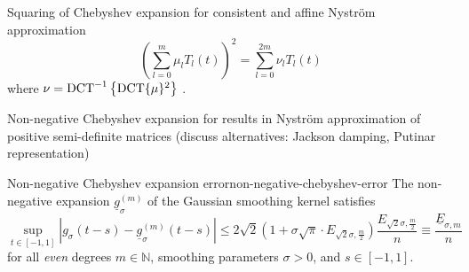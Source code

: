 \documentclass[12pt]{article}
\begin{document}
Squaring of Chebyshev expansion for consistent and affine Nystr\"om approximation
\begin{equation}
    \left( \sum_{l=0}^{m} \mu_l T_l(t) \right)^2 = \sum_{l=0}^{2m} \nu_l T_l(t)
    \label{equ:squared-chebyshev-expansion}
\end{equation}
where $\nu = \operatorname{DCT}^{-1} \left\{ \operatorname{DCT}\{\mu\}^2 \right\}$ .

Non-negative Chebyshev expansion for results in Nystr\"om approximation of positive semi-definite matrices (discuss alternatives: Jackson damping, Putinar representation) 

\begin{lemma}{Non-negative Chebyshev expansion error}{non-negative-chebyshev-error}
    The non-negative expansion $\underline{g}_{\sigma}^{(m)}$ of the Gaussian smoothing kernel satisfies
    \begin{equation}
        \sup_{t \in [-1, 1]} \left| g_{\sigma}(t - s) - \underline{g}_{\sigma}^{(m)}(t - s) \right| \leq 2\sqrt{2} \left(1 + \sigma \sqrt{\pi} \cdot E_{\sqrt{2}\sigma, \frac{m}{2}}\right) \frac{E_{\sqrt{2}\sigma, \frac{m}{2}}}{n} \equiv \frac{\underline{E}_{\sigma, m}}{n}
        \label{equ:2-chebyshev-interpolation-sup-error-kernel}
    \end{equation}
    for all \emph{even} degrees $m \in \mathbb{N}$, smoothing parameters $\sigma > 0$, and $s \in [-1, 1]$.
\end{lemma}
\end{document}
